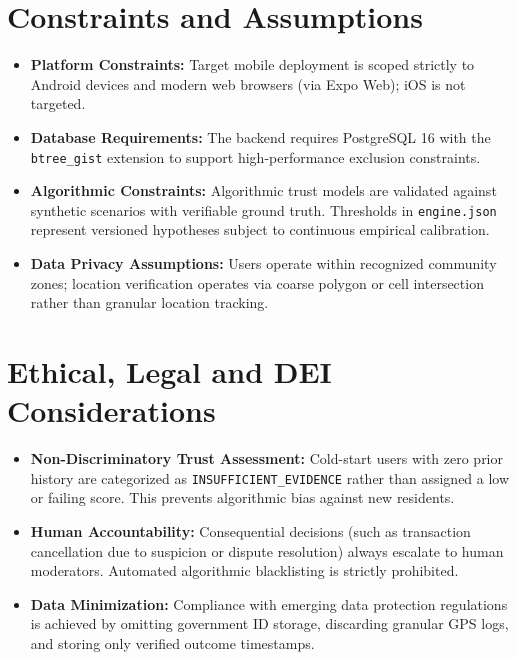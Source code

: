 \section{Constraints and Assumptions}
\begin{itemize}
    \item \textbf{Platform Constraints:} Target mobile deployment is scoped strictly to Android devices and modern web browsers (via Expo Web); iOS is not targeted.
    \item \textbf{Database Requirements:} The backend requires PostgreSQL 16 with the \texttt{btree\_gist} extension to support high-performance exclusion constraints.
    \item \textbf{Algorithmic Constraints:} Algorithmic trust models are validated against synthetic scenarios with verifiable ground truth. Thresholds in \texttt{engine.json} represent versioned hypotheses subject to continuous empirical calibration.
    \item \textbf{Data Privacy Assumptions:} Users operate within recognized community zones; location verification operates via coarse polygon or cell intersection rather than granular location tracking.
\end{itemize}

\section{Ethical, Legal and DEI Considerations}
\begin{itemize}
    \item \textbf{Non-Discriminatory Trust Assessment:} Cold-start users with zero prior history are categorized as \texttt{INSUFFICIENT\_EVIDENCE} rather than assigned a low or failing score. This prevents algorithmic bias against new residents.
    \item \textbf{Human Accountability:} Consequential decisions (such as transaction cancellation due to suspicion or dispute resolution) always escalate to human moderators. Automated algorithmic blacklisting is strictly prohibited.
    \item \textbf{Data Minimization:} Compliance with emerging data protection regulations is achieved by omitting government ID storage, discarding granular GPS logs, and storing only verified outcome timestamps.
\end{itemize}
